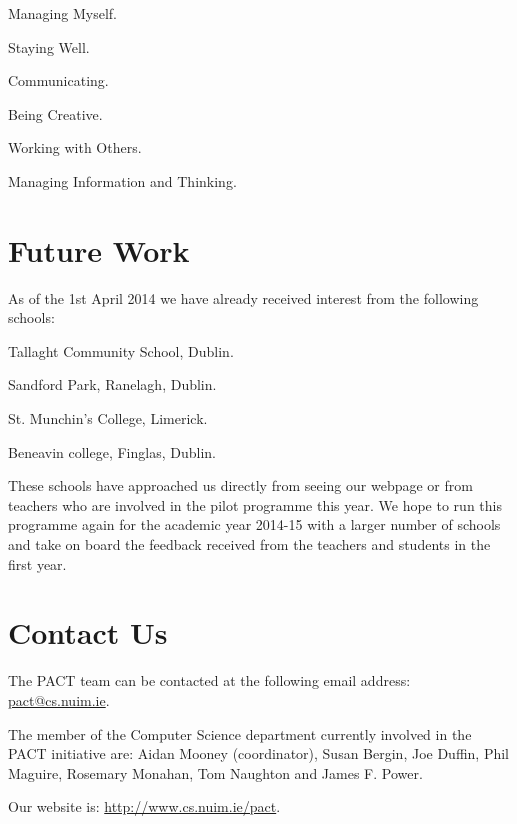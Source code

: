 \documentclass[a4paper]{article}
\begin{document}
\begin{compactenum}
  \item Managing Myself.
  \item Staying Well.
  \item Communicating.
  \item Being Creative.
  \item Working with Others.
  \item Managing Information and Thinking.
\end{compactenum}



\section{Future Work}
As of the 1st April 2014 we have already received interest from the following schools:
\begin{compactitem}
  \item Tallaght Community School, Dublin. 
  \item Sandford Park, Ranelagh, Dublin.
  \item St. Munchin's College, Limerick.
  \item Beneavin college, Finglas, Dublin.
\end{compactitem}

These schools have approached us directly from seeing our webpage or from teachers who are involved in the pilot programme this year. We hope to run this programme again for the academic year 2014-15 with a larger number of schools and take on board the feedback received from the teachers and students in the first year.

\section{Contact Us}
The PACT team can be contacted at the following email address: \url{pact@cs.nuim.ie}.

The member of the Computer Science department currently involved in the PACT initiative are:
Aidan Mooney (coordinator),
Susan Bergin,
Joe Duffin,
Phil Maguire,
Rosemary Monahan,
Tom Naughton and
James F. Power. 




Our website is: \url{http://www.cs.nuim.ie/pact}.



\end{document}
